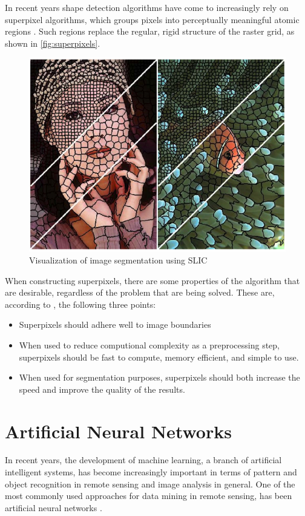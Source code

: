 In recent years shape detection algorithms have come to increasingly rely on superpixel algorithms, which groups pixels into perceptually meaningful atomic regions \citep{Achanta2012}. Such regions replace the regular, rigid structure of the raster grid, as shown in \autoref{fig:superpixels}.

\begin{figure}[!h]
	\centering
	\includegraphics[scale=0.3]{fig/superpixels}
	\caption{Visualization of image segmentation using SLIC \citep{Achanta2012}}
	\label{fig:superpixels}
\end{figure}

When constructing superpixels, there are some properties of the algorithm that are desirable, regardless of the problem that are being solved. These are, according to \citep{Achanta2012}, the following three points:

\begin{itemize}
	\item Superpixels should adhere well to image boundaries
	\item When used to reduce computional complexity as a preprocessing step, superpixels should be fast to compute, memory efficient, and simple to use.
	\item When used for segmentation purposes, superpixels should both increase the speed and improve the quality of the results.
\end{itemize}

\section{Artificial Neural Networks}
In recent years, the development of machine learning, a branch of artificial intelligent systems, has become increasingly important in terms of pattern and object recognition in remote sensing and image analysis in general. One of the most commonly used approaches for data mining in remote sensing, has been artificial neural networks \cite{Lary2016}.

